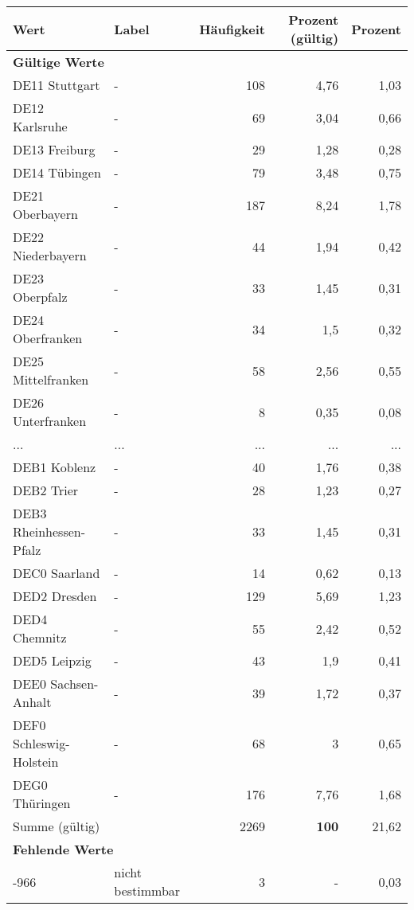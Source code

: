      \begin{longtable}{Xlrrr}
     \toprule
     \textbf{Wert} & \textbf{Label} & \textbf{Häufigkeit} & \textbf{Prozent (gültig)} & \textbf{Prozent} \\
     \endhead
     \midrule
     \multicolumn{5}{l}{\textbf{Gültige Werte}}\\
        \multicolumn{1}{X}{DE11 Stuttgart} & - & 108 & 4,76 & 1,03 \\
        \multicolumn{1}{X}{DE12 Karlsruhe} & - & 69 & 3,04 & 0,66 \\
        \multicolumn{1}{X}{DE13 Freiburg} & - & 29 & 1,28 & 0,28 \\
        \multicolumn{1}{X}{DE14 Tübingen} & - & 79 & 3,48 & 0,75 \\
        \multicolumn{1}{X}{DE21 Oberbayern} & - & 187 & 8,24 & 1,78 \\
        \multicolumn{1}{X}{DE22 Niederbayern} & - & 44 & 1,94 & 0,42 \\
        \multicolumn{1}{X}{DE23 Oberpfalz} & - & 33 & 1,45 & 0,31 \\
        \multicolumn{1}{X}{DE24 Oberfranken} & - & 34 & 1,5 & 0,32 \\
        \multicolumn{1}{X}{DE25 Mittelfranken} & - & 58 & 2,56 & 0,55 \\
        \multicolumn{1}{X}{DE26 Unterfranken} & - & 8 & 0,35 & 0,08 \\
       ... & ... & ... & ... & ... \\
        \multicolumn{1}{X}{DEB1 Koblenz} & - & 40 & 1,76 & 0,38 \\
        \multicolumn{1}{X}{DEB2 Trier} & - & 28 & 1,23 & 0,27 \\
        \multicolumn{1}{X}{DEB3 Rheinhessen-Pfalz} & - & 33 & 1,45 & 0,31 \\
        \multicolumn{1}{X}{DEC0 Saarland} & - & 14 & 0,62 & 0,13 \\
        \multicolumn{1}{X}{DED2 Dresden} & - & 129 & 5,69 & 1,23 \\
        \multicolumn{1}{X}{DED4 Chemnitz} & - & 55 & 2,42 & 0,52 \\
        \multicolumn{1}{X}{DED5 Leipzig} & - & 43 & 1,9 & 0,41 \\
        \multicolumn{1}{X}{DEE0 Sachsen-Anhalt} & - & 39 & 1,72 & 0,37 \\
        \multicolumn{1}{X}{DEF0 Schleswig-Holstein} & - & 68 & 3 & 0,65 \\
        \multicolumn{1}{X}{DEG0 Thüringen} & - & 176 & 7,76 & 1,68 \\
     \midrule
      \multicolumn{2}{l}{Summe (gültig)} & 2269 &
      \textbf{100} &
         21,62 \\
     \multicolumn{5}{l}{\textbf{Fehlende Werte}}\\
       -966 & nicht bestimmbar & 3 & - & 0,03 \\


\end{longtable}
